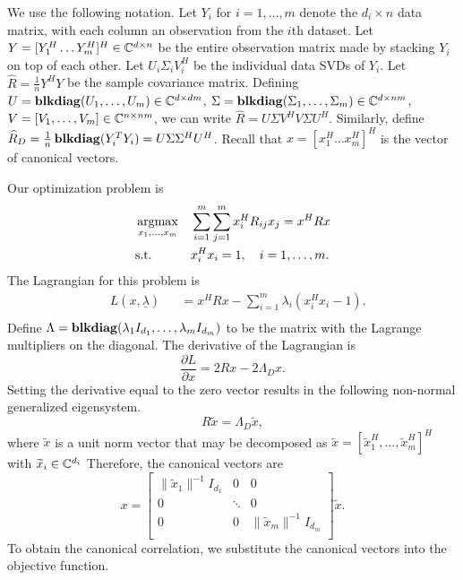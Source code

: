We use the following notation. Let $Y_i$ for $i=1,\dots, m$ denote the $d_i \times n$ data
matrix, with each column an observation from the $i$th dataset. Let $Y=[Y_1^H \dots
Y_m^H]^H\in\mathbb{C}^{d\times n} $ be the entire observation matrix made by stacking $Y_i$
on top of each other. Let $U_i\Sigma_i V_i^H$ be the individual data SVDs of $Y_i$. Let
$\widehat{R} = \frac{1}{n}Y^HY$ be the sample covariance matrix. Defining $U =
\mathop{\bf blkdiag}(U_1,\dots, U_m)\in\mathbb{C}^{d\times dm}$, $\Sigma = \mathop{\bf blkdiag}(\Sigma_1, \dots,
\Sigma_m)\in\mathbb{C}^{d\times nm}$, $V=[V_1,\dots, V_m]\in\mathbb{C}^{n\times nm}$, we can
write $\widehat{R}=U\Sigma V^H V \Sigma U^H$. Similarly, define $\widehat{R}_D =
\frac{1}{n}\mathop{\bf blkdiag}(Y_i^TY_i) = U\Sigma\Sigma^H U^H$. Recall that $x=[x_1^H\dots x_m^H]^H$
is the vector of canonical vectors.

Our optimization problem is
\begin{equation}\label{eq:1a_prob}
\begin{aligned}
&\argmax_{x_1,\dots,x_m}&&\sum_{i=1}^m\sum_{j=1}^mx_i^HR_{ij}x_j=x^HRx\\
&\text{s.t.} &&x_i^Hx_i  = 1,\,\,\,\,\,\, i=1,\dots,m.
\end{aligned}
\end{equation}
The Lagrangian for this problem is
\begin{equation*}
\begin{aligned}
&L(x,\underline{\lambda}) &&= x^H R x -  \sum_{i=1}^m\lambda_i\left(x_i^Hx_i - 1\right).\\
\end{aligned}
\end{equation*}
Define $\Lambda = \mathop{\bf blkdiag}(\lambda_1I_{d_1},\dots,\lambda_mI_{d_m})$ to be the matrix with
the Lagrange multipliers on the diagonal. The derivative of the Lagrangian is
\begin{equation*}
\frac{\partial L}{\partial x} = 2R x - 2\Lambda_Dx.
\end{equation*}
Setting the derivative equal to the zero vector results in the following non-normal
generalized eigensystem.
\begin{equation*}
R\widetilde{x} = \Lambda_D\widetilde{x},
\end{equation*}
where $\widetilde{x}$ is a unit norm vector that may be decomposed as $\widetilde{x} =
[\widetilde{x}_1^H,\dots,\widetilde{x}_m^H]^H$ with $\widetilde{x}_i\in\mathbb{C}^{d_i}$
Therefore, the canonical vectors are
\begin{equation*}
  x = \left[\begin{array}{ccc}\|\widetilde{x}_1\|^{-1} I_{d_1} &0&0\\ 0&\ddots &0 \\
      0&0&\|\widetilde{x}_m\|^{-1}I_{d_m}\\ \end{array}\right]\widetilde{x}.
\end{equation*}
To obtain the canonical correlation, we substitute the canonical vectors into the
objective function. 

